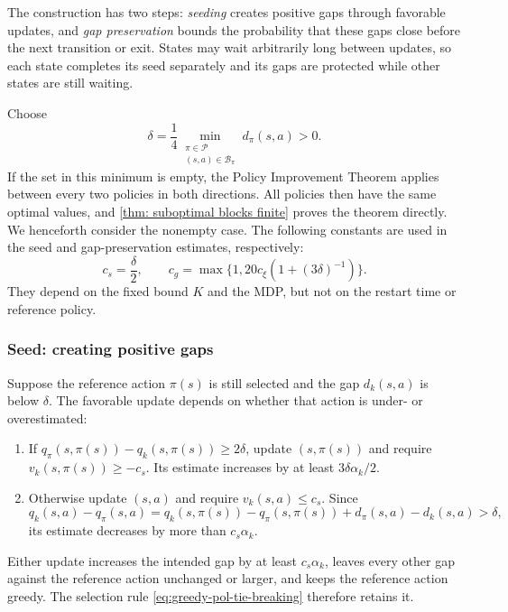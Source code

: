 The construction has two steps: \emph{seeding} creates positive gaps through favorable updates, and \emph{gap preservation} bounds the probability that these gaps close before the next transition or exit. States may wait arbitrarily long between updates, so each state completes its seed separately and its gaps are protected while other states are still waiting.

Choose
\begin{equation}
\label{eq:constants}
\delta=\frac14\min_{\substack{\pi\in\mathcal P\\(s,a)\in\mathcal B_\pi}}d_\pi(s,a)>0.
\end{equation}
If the set in this minimum is empty, the Policy Improvement Theorem applies between every two policies in both directions. All policies then have the same optimal values, and \autoref{thm: suboptimal blocks finite} proves the theorem directly. We henceforth consider the nonempty case.
The following constants are used in the seed and gap-preservation estimates, respectively:
\begin{equation}
\label{eq:c-def}
c_s=\frac\delta2,
\qquad c_g=\max\{1,20c_\xi(1+(3\delta)^{-1})\}.
\end{equation}
They depend on the fixed bound $K$ and the MDP, but not on the restart time or reference policy.

\subsubsection{Seed: creating positive gaps}
Suppose the reference action $\pi(s)$ is still selected and the gap $d_k(s,a)$ is below $\delta$. The favorable update depends on whether that action is under- or overestimated:
\begin{enumerate}
\item If $q_\pi(s,\pi(s))-q_k(s,\pi(s))\ge2\delta$, update $(s,\pi(s))$ and require $v_k(s,\pi(s))\ge-c_s$. Its estimate increases by at least $3\delta\alpha_k/2$.
\item Otherwise update $(s,a)$ and require $v_k(s,a)\le c_s$. Since
\[
q_k(s,a)-q_\pi(s,a)
=q_k(s,\pi(s))-q_\pi(s,\pi(s))+d_\pi(s,a)-d_k(s,a)>\delta,
\]
its estimate decreases by more than $c_s\alpha_k$.
\end{enumerate}
Either update increases the intended gap by at least $c_s\alpha_k$, leaves every other gap against the reference action unchanged or larger, and keeps the reference action greedy. The selection rule \eqref{eq:greedy-pol-tie-breaking} therefore retains it.

